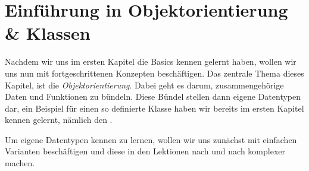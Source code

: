 \chapter[Objektorientierung]{Einführung in Objektorientierung \& Klassen}
\pagestyle{empty}

Nachdem wir uns im ersten Kapitel die Basics kennen gelernt haben, wollen wir uns nun mit fortgeschrittenen Konzepten beschäftigen.
Das zentrale Thema dieses Kapitel, ist die \emph{Objektorientierung}.
Dabei geht es darum, zusammengehörige Daten und Funktionen zu bündeln.
Diese Bündel stellen dann eigene Datentypen dar, ein Beispiel für einen so definierte \glqq{}Klasse\grqq{} haben wir bereits im ersten Kapitel kennen gelernt, nämlich den .

Um eigene Datentypen kennen zu lernen, wollen wir uns zunächst mit einfachen Varianten beschäftigen und diese in den Lektionen nach und nach komplexer machen.

\pagestyle{fancy}




\pagestyle{empty}
